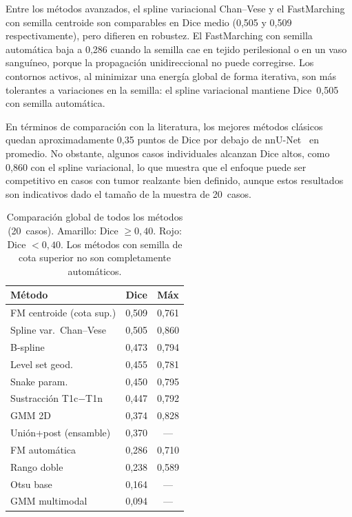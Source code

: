 \documentclass[conference]{IEEEtran}
\newcommand{\cm}[1]{\cellcolor{cellmid}#1}
\newcommand{\cb}[1]{\cellcolor{cellbad}#1}
\begin{document}
Entre los m\'{e}todos avanzados, el spline variacional Chan--Vese
y el FastMarching con semilla centroide son comparables en Dice
medio (0,505 y 0,509 respectivamente), pero difieren en robustez.
El FastMarching con semilla autom\'{a}tica baja a 0,286 cuando la
semilla cae en tejido perilesional o en un vaso sangu\'{i}neo,
porque la propagaci\'{o}n unidireccional no puede corregirse.
Los contornos activos, al minimizar una energ\'{i}a global de forma
iterativa, son m\'{a}s tolerantes a variaciones en la semilla:
el spline variacional mantiene Dice~0,505 con semilla
autom\'{a}tica.

En t\'{e}rminos de comparaci\'{o}n con la literatura, los mejores
m\'{e}todos cl\'{a}sicos quedan aproximadamente 0,35 puntos de Dice
por debajo de nnU-Net~\cite{baig2024nnunet} en promedio.
No obstante, algunos casos individuales alcanzan Dice altos, como
0,860 con el spline variacional, lo que muestra que el enfoque
puede ser competitivo en casos con tumor realzante bien definido,
aunque estos resultados son indicativos dado el tama\~{n}o de la
muestra de 20~casos.

\begin{table}[h]
\centering\small
\caption{Comparaci\'{o}n global de todos los m\'{e}todos
(20~casos). \colorbox{cellmid}{Amarillo}: Dice $\ge 0{,}40$.
\colorbox{cellbad}{Rojo}: Dice $< 0{,}40$.
Los m\'{e}todos con semilla de cota superior no son completamente
autom\'{a}ticos.}
\label{tab:global}
\begin{tabular}{lcc}
\toprule
M\'{e}todo & Dice & M\'{a}x \\
\midrule
\cm{FM centroide (cota sup.)} & \cm{0,509} & 0,761 \\
\cm{Spline var.\ Chan--Vese} & \cm{0,505} & 0,860 \\
\cm{B-spline} & \cm{0,473} & 0,794 \\
\cm{Level set geod.} & \cm{0,455} & 0,781 \\
\cm{Snake param.} & \cm{0,450} & 0,795 \\
\cm{Sustracci\'{o}n T1c$-$T1n} & \cm{0,447} & 0,792 \\
\cb{GMM 2D} & \cb{0,374} & 0,828 \\
\cb{Uni\'{o}n+post (ensamble)} & \cb{0,370} & --- \\
\cb{FM autom\'{a}tica} & \cb{0,286} & 0,710 \\
\cb{Rango doble} & \cb{0,238} & 0,589 \\
\cb{Otsu base} & \cb{0,164} & --- \\
\cb{GMM multimodal} & \cb{0,094} & --- \\
\bottomrule
\end{tabular}
\end{table}
\end{document}

